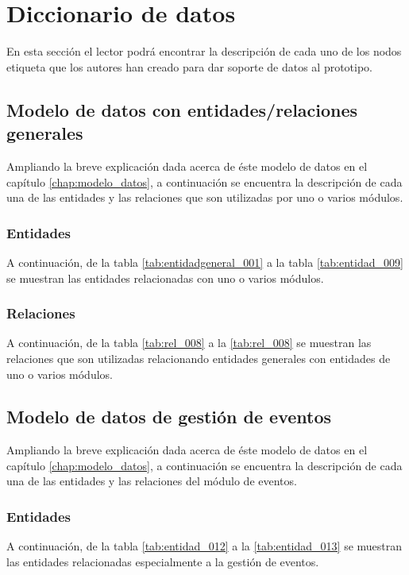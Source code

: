 \chapter{Diccionario de datos}
\label{app:diccionario_datos}

En esta sección el lector podrá encontrar la descripción de cada uno de los nodos etiqueta que los autores han creado para dar soporte de datos al prototipo.

\section{Modelo de datos con entidades/relaciones generales}
Ampliando la breve explicación dada acerca de éste modelo de datos en el capítulo \ref{chap:modelo_datos}, a continuación se encuentra la descripción de cada una de las entidades y las relaciones que son utilizadas por uno o varios módulos.

\subsection{Entidades}
A continuación, de la tabla \ref{tab:entidadgeneral_001} a la tabla \ref{tab:entidad_009} se muestran las entidades relacionadas con uno o varios módulos.

\clearpage



\subsection{Relaciones}
A continuación, de la tabla \ref{tab:rel_008} a la \ref{tab:rel_008} se muestran las relaciones que son utilizadas relacionando entidades generales con entidades de uno o varios módulos.



\section{Modelo de datos de gestión de eventos}
Ampliando la breve explicación dada acerca de éste modelo de datos en el capítulo \ref{chap:modelo_datos}, a continuación se encuentra la descripción de cada una de las entidades y las relaciones del módulo de eventos.

\subsection{Entidades}
A continuación, de la tabla \ref{tab:entidad_012} a la \ref{tab:entidad_013} se muestran las entidades relacionadas especialmente a la gestión de eventos.

